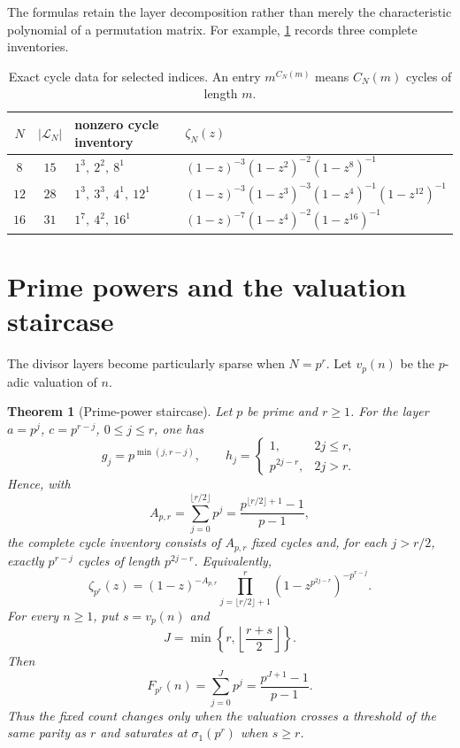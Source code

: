\documentclass[11pt,a4paper]{amsart}
\newcommand{\cL}{\mathcal L}
\newtheorem{theorem}{Theorem}[section]
\begin{document}
The formulas retain the layer decomposition rather than merely the
characteristic polynomial of a permutation matrix.  For example,
\cref{tab:examples} records three complete inventories.

\begin{table}[t]
\centering
\caption{Exact cycle data for selected indices.  An entry $m^{C_N(m)}$
means $C_N(m)$ cycles of length $m$.}
\label{tab:examples}
\begin{tabular}{@{}ccll@{}}
\toprule
$N$ & $|\cL_N|$ & nonzero cycle inventory & $\zeta_N(z)$ \\
\midrule
$8$  & $15$ & $1^3,\ 2^2,\ 8^1$
 & $(1-z)^{-3}(1-z^2)^{-2}(1-z^8)^{-1}$ \\
$12$ & $28$ & $1^3,\ 3^3,\ 4^1,\ 12^1$
 & $(1-z)^{-3}(1-z^3)^{-3}(1-z^4)^{-1}(1-z^{12})^{-1}$ \\
$16$ & $31$ & $1^7,\ 4^2,\ 16^1$
 & $(1-z)^{-7}(1-z^4)^{-2}(1-z^{16})^{-1}$ \\
\bottomrule
\end{tabular}
\end{table}

\section{Prime powers and the valuation staircase}

The divisor layers become particularly sparse when $N=p^r$.  Let
$v_p(n)$ be the $p$-adic valuation of $n$.

\begin{theorem}[Prime-power staircase]
\label{thm:primepower}
Let $p$ be prime and $r\geq1$.  For the layer $a=p^j$, $c=p^{r-j}$,
$0\leq j\leq r$, one has
\begin{equation}
 \label{eq:prime-layer}
 g_j=p^{\min(j,r-j)},\qquad
 h_j=
 \begin{cases}
  1,&2j\leq r,\\
  p^{2j-r},&2j>r.
 \end{cases}
\end{equation}
Hence, with
\[
 A_{p,r}=\sum_{j=0}^{\lfloor r/2\rfloor}p^j
 =\frac{p^{\lfloor r/2\rfloor+1}-1}{p-1},
\]
the complete cycle inventory consists of $A_{p,r}$ fixed cycles and,
for each $j>r/2$, exactly $p^{r-j}$ cycles of length $p^{2j-r}$.
Equivalently,
\begin{equation}
 \label{eq:prime-zeta}
 \zeta_{p^r}(z)
 =(1-z)^{-A_{p,r}}
 \prod_{j=\lfloor r/2\rfloor+1}^{r}
       (1-z^{p^{2j-r}})^{-p^{r-j}}.
\end{equation}
For every $n\geq1$, put $s=v_p(n)$ and
\[
 J=\min\left\{r,\left\lfloor\frac{r+s}{2}\right\rfloor\right\}.
\]
Then
\begin{equation}
 \label{eq:staircase}
 F_{p^r}(n)=\sum_{j=0}^{J}p^j=\frac{p^{J+1}-1}{p-1}.
\end{equation}
Thus the fixed count changes only when the valuation crosses a threshold
of the same parity as $r$ and saturates at $\sigma_1(p^r)$ when $s\geq r$.
\end{theorem}
\end{document}
